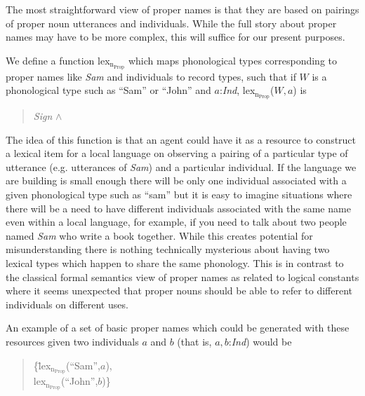The most straightforward view of proper names is that they are based
on pairings of proper noun utterances and individuals.  While the full
story about proper names may have to be more complex, this will
suffice for our present purposes.

We define a function lex$_{\mathrm{n}_\mathrm{Prop}}$  which maps
 phonological types corresponding to proper names like
\textit{Sam} and individuals to record types, such that if $W$ is
a phonological type such as ``Sam'' or ``John'' and $a$:\textit{Ind},
lex$_{\mathrm{n}_\mathrm{Prop}}$($W,a$) is
\begin{quote}
\textit{Sign} \d{$\wedge$} \\
\end{quote}

\noindent The idea of this function is that an agent could have it as a resource
to construct a lexical item for a local language on observing a
pairing of a particular type of utterance (e.g. utterances of
\textit{Sam}) and a particular individual. If the language we are building is small enough there will
be only one individual associated with a given phonological type such
as ``sam'' but it is easy to imagine situations where there will be a
need to have different individuals associated with the same name even
within a local language, for example, if you need to talk about two
people named \textit{Sam} who write a book together.  While this
creates potential for misunderstanding there is nothing technically
mysterious about having two lexical types which happen to share the
same phonology.  This is in contrast to the classical formal semantics
view of proper names as related to logical constants where it seems
unexpected that proper nouns should be able to refer to different
individuals on different uses. 

An example of a set of basic proper names which could be generated
with these resources given two individuals $a$ and $b$ (that is,
$a,b$:\textit{Ind}) would be
\begin{quote}
\begin{tabbing}
\{\=lex$_{\mathrm{n}_\mathrm{Prop}}$(``Sam'',$a$), \\
\>lex$_{\mathrm{n}_\mathrm{Prop}}$(``John'',$b$)\}
\end{tabbing}

\end{quote}



